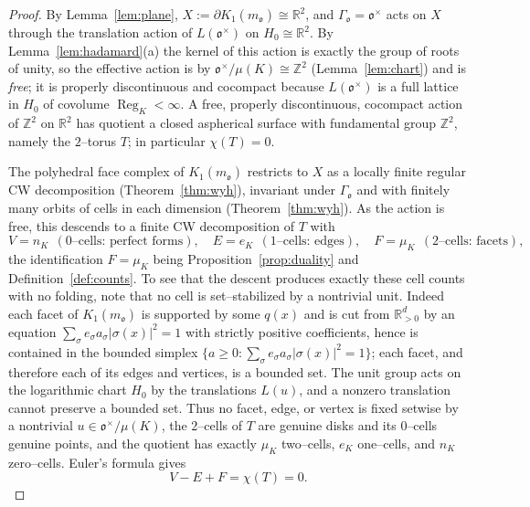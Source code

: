 \documentclass[11pt,reqno]{amsart}
\theoremstyle{plain}
\theoremstyle{definition}
\newcommand{\Z}{\mathbb{Z}}
\newcommand{\R}{\mathbb{R}}
\newcommand{\Reg}{\operatorname{Reg}}
\newcommand{\Ok}{\mathfrak{o}}
\newcommand{\bdy}{\partial}
\newcommand{\nK}{n_K}
\newcommand{\muK}{\mu_K}
\begin{document}
\begin{proof}
By Lemma~\ref{lem:plane}, $X:=\bdy K_1(m_\Ok)\cong\R^2$, and $\Gamma_\Ok=\Ok^\times$ acts on $X$ through the
translation action of $L(\Ok^\times)$ on $H_0\cong\R^2$. By Lemma~\ref{lem:hadamard}(a) the kernel of this
action is exactly the group of roots of unity, so the effective action is by
$\Ok^\times/\mu(K)\cong\Z^2$ (Lemma~\ref{lem:chart}) and is \emph{free}; it is properly discontinuous and
cocompact because $L(\Ok^\times)$ is a full lattice in $H_0$ of covolume $\Reg_K<\infty$. A free, properly
discontinuous, cocompact action of $\Z^2$ on $\R^2$ has quotient a closed aspherical surface with
fundamental group $\Z^2$, namely the $2$--torus $T$; in particular $\chi(T)=0$.

The polyhedral face complex of $K_1(m_\Ok)$ restricts to $X$ as a locally finite regular CW decomposition
(Theorem~\ref{thm:wyh}), invariant under $\Gamma_\Ok$ and with finitely many orbits of cells in each
dimension (Theorem~\ref{thm:wyh}). As the action is free, this descends to a finite CW decomposition of $T$
with
\[
V=\nK\ \ (\text{$0$--cells: perfect forms}),\quad
E=e_K\ \ (\text{$1$--cells: edges}),\quad
F=\muK\ \ (\text{$2$--cells: facets}),
\]
the identification $F=\muK$ being Proposition~\ref{prop:duality} and Definition~\ref{def:counts}. To see
that the descent produces exactly these cell counts with no folding, note that no cell is set--stabilized by
a nontrivial unit. Indeed each facet of $K_1(m_\Ok)$ is supported by some $q(x)$ and is cut from
$\R^d_{>0}$ by an equation $\sum_\sigma e_\sigma a_\sigma|\sigma(x)|^2=1$ with strictly positive
coefficients, hence is contained in the bounded simplex $\{a\ge0:\sum_\sigma e_\sigma a_\sigma|\sigma(x)|^2
=1\}$; each facet, and therefore each of its edges and vertices, is a bounded set. The unit group acts on
the logarithmic chart $H_0$ by the translations $L(u)$, and a nonzero translation cannot preserve a bounded
set. Thus no facet, edge, or vertex is fixed setwise by a nontrivial $u\in\Ok^\times/\mu(K)$, the
$2$--cells of $T$ are genuine disks and its $0$--cells genuine points, and the quotient has exactly $\muK$
two--cells, $e_K$ one--cells, and $\nK$ zero--cells. Euler's formula gives
\begin{equation}\label{eq:euler}
V-E+F=\chi(T)=0 .
\end{equation}


\end{proof}
\end{document}

